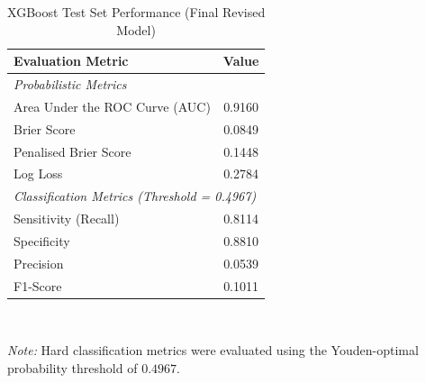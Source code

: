\documentclass{report}\usepackage[]{graphicx}\usepackage[]{xcolor}
\begin{document}
\begin{table}[H]
    \centering
    \caption{XGBoost Test Set Performance (Final Revised Model)}
    \label{tab:xgb_test_eval_final}
    \begin{tabular}{lc}
        \hline
        \textbf{Evaluation Metric} & \textbf{Value} \\
        \hline
        \multicolumn{2}{l}{\textit{Probabilistic Metrics}} \\
        Area Under the ROC Curve (AUC) & 0.9160 \\
        Brier Score & 0.0849 \\
        Penalised Brier Score & 0.1448 \\
        Log Loss & 0.2784 \\
        \hline
        \multicolumn{2}{l}{\textit{Classification Metrics (Threshold = 0.4967)}} \\
        Sensitivity (Recall) & 0.8114 \\
        Specificity & 0.8810 \\
        Precision & 0.0539 \\
        F1-Score & 0.1011 \\
        \hline
    \end{tabular}
    \\[1ex]
    \raggedright
    \footnotesize \textit{Note:} Hard classification metrics were evaluated using the Youden-optimal probability threshold of $0.4967$.
\end{table}


%  
% 


% 

\end{document}
